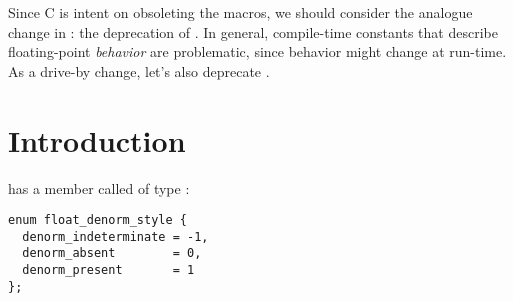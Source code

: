 \newcommand\wgTitle{Deprecate \code{numeric\_limits::has\_denorm}}
\newcommand\wgName{Matthias Kretz <m.kretz@gsi.de>}
\newcommand\wgDocumentNumber{D2614R0}
\newcommand\wgGroup{SG6, LEWG}
\newcommand\wgTarget{\CC{}26}
\newcommand\wgAcknowledgements{
Thanks to WG14 and specifically Fred Tydeman for their work on \code{*\_HAS\_SUBNORM} and 
presenting in SG6. Thanks to Dietmar Kühl, Fred Tydeman, Jens Maurer, John McFarlane, and 
Mark Hoemmen for the discussion in SG6 that motivated this paper. Thanks to Mark Hoemmen 
for pointing out that we should deprecate \code{has_denorm_loss}.
}

\usepackage{mymacros}
\usepackage{wg21}
\usepackage{changelog}
\usepackage{underscore}



\newcommand\wglink[1]{\href{https://wg21.link/#1}{#1}}


\begin{wgTitlepage}
  Since C is intent on obsoleting the  macros, we should consider the 
  analogue change in \CC{}: the deprecation of . In 
  general, compile-time constants that describe floating-point \emph{behavior} are 
  problematic, since behavior might change at run-time.
  As a drive-by change, let's also deprecate .
\end{wgTitlepage}

\pagestyle{scrheadings}

%

%

\section{Introduction}

 has a member called  of type 
:
\medskip\begin{lstlisting}[style=Vc]
enum float_denorm_style {
  denorm_indeterminate = -1,
  denorm_absent        = 0,
  denorm_present       = 1
};
\end{lstlisting}

